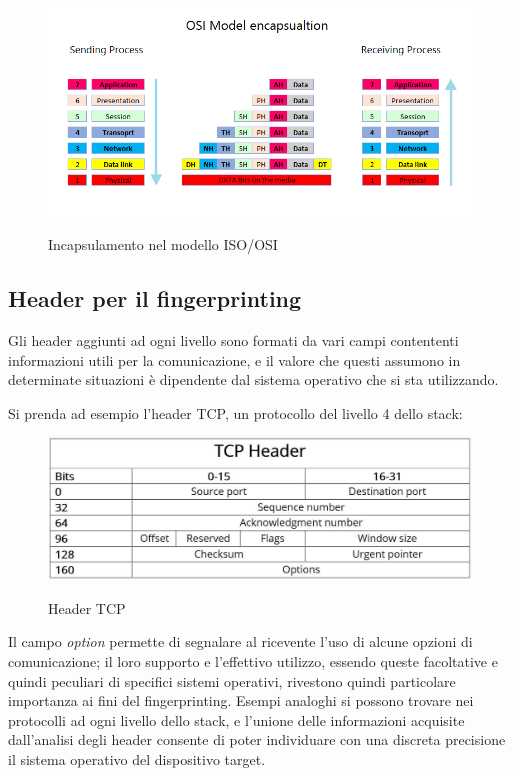 \begin{figure}[h]
	\centering
	\includegraphics[width=\textwidth]{figures/incapsulamento.png}
	\caption{Incapsulamento nel modello ISO/OSI}
	\label{incapsulamento}
	\cite{incapsulamento}
\end{figure}

\subsection{Header per il fingerprinting}
Gli header aggiunti ad ogni livello sono formati da vari campi contententi informazioni utili per la comunicazione, e il valore che questi assumono in determinate situazioni è dipendente dal sistema operativo che si sta utilizzando.

Si prenda ad esempio l'header TCP, un protocollo del livello 4 dello stack:\\

\begin{figure}[H]
	\centering
	\includegraphics[width=\textwidth]{figures/headerTCP.JPG}
	\caption{Header TCP}
	\label{headerTCP}
	\cite{headerTCP}
\end{figure}

Il campo \textit{option} permette di segnalare al ricevente l'uso di alcune opzioni di comunicazione; il loro supporto e l'effettivo utilizzo, essendo queste facoltative e quindi peculiari di specifici sistemi operativi, rivestono quindi particolare importanza ai fini del fingerprinting.
Esempi analoghi si possono trovare nei protocolli ad ogni livello dello stack, e l'unione delle informazioni acquisite dall'analisi degli header consente di poter individuare con una discreta precisione il sistema operativo del dispositivo target.